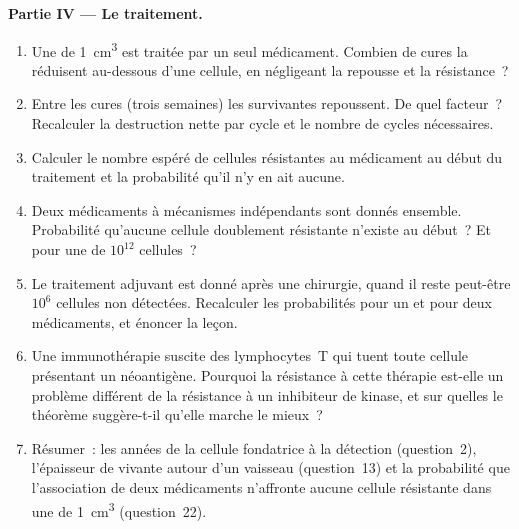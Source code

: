 \begin{problem}
\medskip
\noindent\textbf{Partie IV --- Le traitement.}
\begin{enumerate}[resume]
  \item Une  de \qty{1}{cm^3} est traitée par un seul médicament.
        Combien de cures la réduisent au-dessous d'une cellule, en
        négligeant la repousse et la résistance~?
  \item Entre les cures (trois semaines) les survivantes repoussent. De
        quel facteur~? Recalculer la destruction nette par cycle et le
        nombre de cycles nécessaires.
  \item Calculer le nombre espéré de cellules résistantes au médicament
        au début du traitement et la probabilité qu'il n'y en ait
        aucune.
  \item Deux médicaments à mécanismes indépendants sont donnés
        ensemble. Probabilité qu'aucune cellule doublement résistante
        n'existe au début~? Et pour une  de $10^{12}$ cellules~?
  \item Le traitement adjuvant est donné après une chirurgie, quand il
        reste peut-être $10^{6}$ cellules non détectées. Recalculer les
        probabilités pour un et pour deux médicaments, et énoncer la
        leçon.
  \item Une immunothérapie suscite des lymphocytes~T qui tuent toute
        cellule présentant un néoantigène. Pourquoi la résistance à
        cette thérapie est-elle un problème différent de la résistance
        à un inhibiteur de kinase, et sur quelles  le théorème
        suggère-t-il qu'elle marche le mieux~?
  \item Résumer~: les années de la cellule fondatrice à la détection
        (question~2), l'épaisseur de  vivante autour d'un
        vaisseau (question~13) et la probabilité que l'association de
        deux médicaments n'affronte aucune cellule résistante dans une
         de \qty{1}{cm^3} (question~22).
\end{enumerate}
\end{problem}
